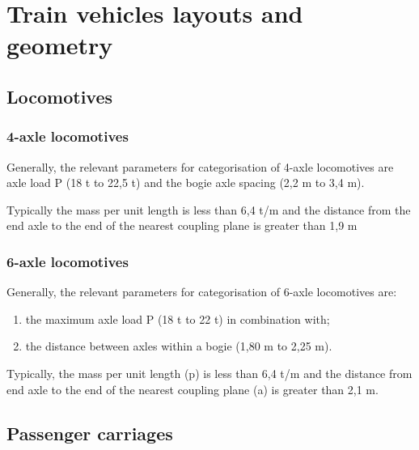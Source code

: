 

\chapter{Train vehicles layouts and geometry}



\section{Locomotives}
\subsection{4-axle locomotives}
Generally, the relevant parameters for categorisation of 4-axle locomotives are axle load P (18 t to 22,5 t) and the bogie axle spacing (2,2 m to 3,4 m).

Typically the mass per unit length is less than 6,4 t/m and the distance from the end axle to the end of the nearest coupling plane is greater than 1,9 m

\subsection{6-axle locomotives}

Generally, the relevant parameters for categorisation of 6-axle locomotives are:

\begin{enumerate}[-]
\item the maximum axle load P (18 t to 22 t) in combination with;
\item the distance between axles within a bogie (1,80 m to 2,25 m).
\end{enumerate}

Typically, the mass per unit length (p) is less than 6,4 t/m and the distance from end axle to the end of the nearest coupling plane (a) is greater than 2,1 m.

\section{Passenger carriages}
 
